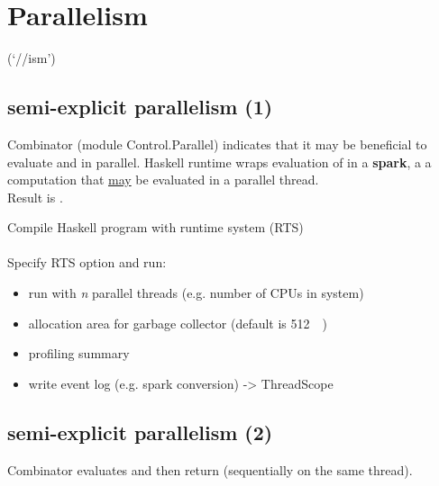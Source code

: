


\chapter{Parallelism} %
\label{cha:parallelism}
(`//ism')


\section{semi-explicit parallelism (1)}

Combinator  (module Control.Parallel) 
indicates that it may be beneficial to evaluate  and  in parallel. Haskell runtime wraps evaluation of  in a \textbf{spark}, a a computation that \underline{may} be evaluated in a parallel thread.\\
Result is . 



Compile Haskell program with runtime system (RTS)\\
\\
Specify RTS option and run:\\

\begin{itemize}
    \item {} run with \textit{n} parallel threads (e.g. number of CPUs in system)
    \item {} allocation area for garbage collector (default is \SI{512}{\kibi\byte})
    \item {} profiling summary
    \item {} write event log (e.g. spark conversion) -> ThreadScope
\end{itemize}



\section{semi-explicit parallelism (2)}

Combinator  
evaluates  and then return  (sequentially on the same thread).

